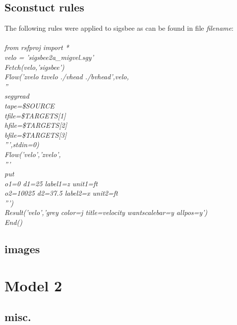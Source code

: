 \subsection{Sconstuct rules}
The following rules were applied to sigsbee as can be found in file \emph{filename}:\\
\emph{
\small{
\\
from rsfproj import *\\                                                                                             
velo = 'sigsbee2a\_migvel.sgy'\\
Fetch(velo,'sigsbee')\\                                                         Flow('zvelo tzvelo ./vhead ./bvhead',velo,\\
     \indent ''\\
     \indent segyread\\
     \indent tape=\$SOURCE\\
     \indent tfile=\${TARGETS[1]}\\
     \indent hfile=\${TARGETS[2]}\\
     \indent bfile=\${TARGETS[3]}\\
     \indent ''',stdin=0)\\                                                                                                       
Flow('velo','zvelo',\\
        \indent'''\\
        \indent put\\
        \indent o1=0     d1=25   label1=z unit1=ft\\
        \indent o2=10025 d2=37.5 label2=x unit2=ft\\
        \indent ''')\\                                                                                                                         
Result('velo','grey color=j title=velocity wantscalebar=y allpos=y')\\
End()\\
}}                                                                                                                                           \subsection{images}

\section{Model 2}
\subsection{misc.}



